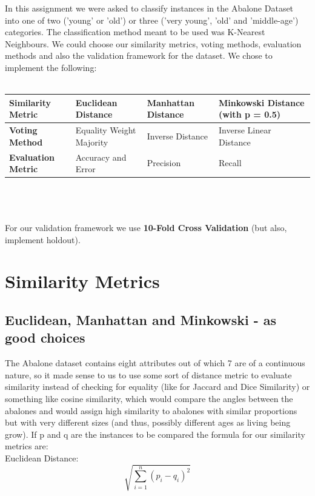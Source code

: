 In this assignment we were asked to classify instances in the Abalone Dataset into one of two 
('young' or 'old') or three ('very young', 'old' and 'middle-age') categories. The classification method meant to be used was K-Nearest Neighbours. We could choose our similarity metrics, voting methods, evaluation methods and also the validation framework for the dataset. We chose to implement the following:
\\\\
{\centering
\begin{tabular}{|p{3.5cm}||p{3.5cm}|p{3.5cm}|p{3.75cm}|}
 \hline
 {\bf Similarity Metric} & Euclidean Distance & Manhattan Distance & Minkowski Distance (with p = 0.5)\\
 \hline
 {\bf Voting Method} & Equality Weight Majority & Inverse Distance & Inverse Linear Distance \\ 
 \hline
 {\bf Evaluation Metric} & Accuracy and Error & Precision & Recall \\ 
 \hline
\end{tabular} }
\\\\ \\
For our validation framework we use {\bf 10-Fold Cross Validation} (but also, implement holdout). 

 

\section{Similarity Metrics}

\subsection{Euclidean, Manhattan and Minkowski - as good choices}

The Abalone dataset contains eight attributes out of which 7 are of a continuous nature, so it made sense to us to use some sort of distance metric to evaluate similarity instead of checking for equality  (like for Jaccard and Dice Similarity) or something like cosine similarity, which would compare the angles between the abalones and would assign high similarity to abalones with similar proportions but with very different sizes (and thus, possibly different ages as living being grow). If p and q are the instances to be compared the formula for our similarity metrics are: \\

Euclidean Distance:
\begin{equation}
\sqrt{\sum_{i=1}^{n} (p_{i} - q_{i})^{2}}
\end{equation}

